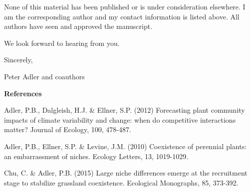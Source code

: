 \documentclass[11pt]{letter}
\begin{document}
None of this material has been published or is under consideration elsewhere. I am the corresponding author and my contact
information is listed above. All authors have seen and approved the manuscript. 

We look forward to hearing from you. 

Sincerely,

Peter Adler and coauthors




\newpage

\textbf{References}

Adler, P.B., Dalgleish, H.J. \& Ellner, S.P. (2012) Forecasting plant community impacts of climate variability and change: when do competitive interactions matter? Journal of Ecology, 100, 478-487.

Adler, P.B., Ellner, S.P. \& Levine, J.M. (2010) Coexistence of perennial plants: an embarrassment of niches. Ecology Letters, 13, 1019-1029.

Chu, C. \& Adler, P.B. (2015) Large niche differences emerge at the recruitment stage to stabilize grassland coexistence. Ecological Monographs, 85, 373-392.
\end{document}
